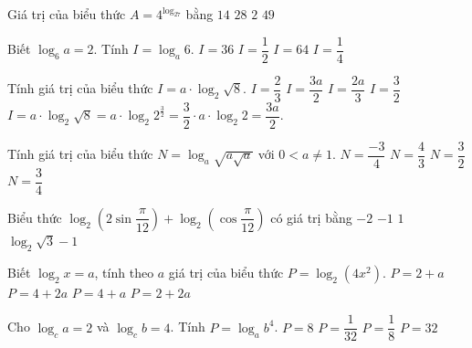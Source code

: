 \begin{ex}
	Giá trị của biểu thức $A=4^{\log_27}$ bằng
	\choice
	{$14$}
	{$28$}
	{$2$}
	{\True $49$}
\end{ex}

\begin{ex}
	Biết $\log_6 a =2$. Tính $I=\log_a 6$.
	\choice
	{$I=36$}
	{\True $I=\dfrac{1}{2}$}
	{$I=64$}
	{$I=\dfrac{1}{4}$}
	
\end{ex}

\begin{ex}
	Tính giá trị của biểu thức $I = a \cdot \log_2 \sqrt{8}$.
	\choice
	{$I = \dfrac{2}{3}$}
	{\True $I = \dfrac{3a}{2}$}
	{$I = \dfrac{2a}{3}$}
	{$I = \dfrac{3}{2}$}
	\loigiai
	{
		$I = a \cdot \log_2 \sqrt{8} = a \cdot \log _2 2^{\frac{3}{2}} = \dfrac{3}{2} \cdot a \cdot \log_2 2 = \dfrac{3a}{2}$.
	}
\end{ex}

\begin{ex}
	Tính giá trị của biểu thức $N=\log_a\sqrt{a\sqrt{a}}$ với $0<a\ne 1$.
	\choice
	{$N=\dfrac{-3}{4}$}
	{$N=\dfrac{4}{3}$}
	{$N=\dfrac{3}{2}$}
	{\True $N=\dfrac{3}{4}$}
\end{ex}

\begin{ex}
	Biểu thức $ \log_2\left(2\sin\dfrac{\pi}{12}\right)+ \log_2\left(\cos\dfrac{\pi}{12}\right)$ có giá trị bằng
	\choice
	{$ -2 $}
	{\True $ -1 $}
	{$ 1 $}
	{$ \log_2\sqrt{3}-1 $}
\end{ex}

\begin{ex}
	Biết $\log_2x=a$, tính theo $a$ giá trị của biểu thức $P=\log_2\left( 4x^2\right) $.
	\choice
	{$P=2+a$}
	{$P=4+2a$}
	{$P=4+a$}
	{\True $P=2+2a$}
\end{ex}


\begin{ex}
	Cho $\log_c a=2$ và $\log_c b=4$. Tính $P=\log_a b^4$.
	\choice
	{\True $P=8$}
	{$P=\dfrac{1}{32}$}
	{$P=\dfrac{1}{8}$}
	{$P=32$}
\end{ex}


